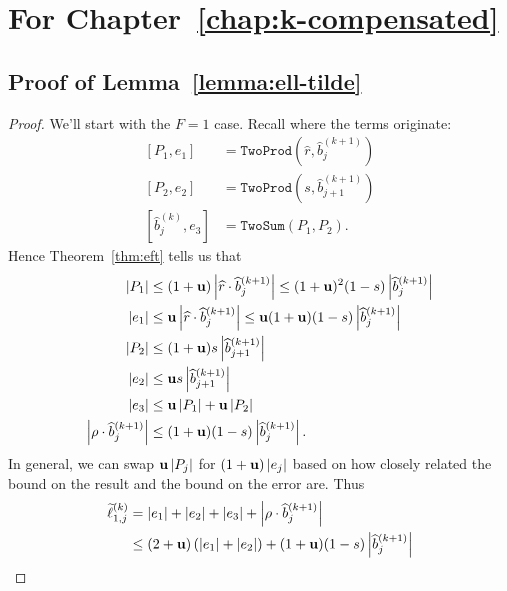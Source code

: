 \section{For Chapter~\ref{chap:k-compensated}}

\subsection{Proof of Lemma~\ref{lemma:ell-tilde}}\label{proof:ell-tilde}

\begin{proof}
We'll start with the \(F = 1\) case. Recall where the terms originate:
\begin{align}
\left[P_1, e_1\right] &= \mathtt{TwoProd}\left(\widehat{r},
  \widehat{b}_j^{(k + 1)}\right) \\
\left[P_2, e_2\right] &= \mathtt{TwoProd}\left(s,
  \widehat{b}_{j + 1}^{(k + 1)}\right) \\
\left[\widehat{b}_j^{(k)}, e_3\right] &= \mathtt{TwoSum}\left(P_1, P_2\right).
\end{align}
Hence Theorem~\ref{thm:eft} tells us that
\begin{align}
\left|P_1\right| &\leq (1 + \mathbf{u})\left|\widehat{r} \cdot
  \widehat{b}_j^{(k + 1)}\right| \leq (1 + \mathbf{u})^2 (1 - s)
  \left|\widehat{b}_j^{(k + 1)}\right| \\
\left|e_1\right| &\leq \mathbf{u} \left|\widehat{r} \cdot
  \widehat{b}_j^{(k + 1)}\right| \leq \mathbf{u}(1 + \mathbf{u})(1 - s) \left|
  \widehat{b}_j^{(k + 1)}\right| \\
\left|P_2\right| &\leq (1 + \mathbf{u}) s
  \left|\widehat{b}_{j + 1}^{(k + 1)}\right| \\
\left|e_2\right| &\leq \mathbf{u} s \left|\widehat{b}_{j + 1}^{(k + 1)}\right| \\
\left|e_3\right| &\leq \mathbf{u} \left|P_1\right| + \mathbf{u}\left|P_2\right| \\
\left|\rho \cdot \widehat{b}_j^{(k + 1)}\right| &\leq
(1 + \mathbf{u})(1 - s) \left|\widehat{b}_j^{(k + 1)}\right|.
\end{align}
In general, we can swap \(\mathbf{u}\left|P_j\right|\) for
\((1 + \mathbf{u})\left|e_j\right|\) based on how closely related the bound
on the result and the bound on the error are. Thus
\begin{align}
\widetilde{\ell}_{1, j}^{(k)} &= \left|e_1\right| + \left|e_2\right| +
  \left|e_3\right| + \left|\rho \cdot \widehat{b}_j^{(k + 1)}\right| \\
&\leq (2 + \mach)\left(\left|e_1\right| + \left|e_2\right|\right) +
  (1 + \mach)(1 - s) \left|\widehat{b}_j^{(k + 1)}\right| \\

\end{align}
\end{proof}
